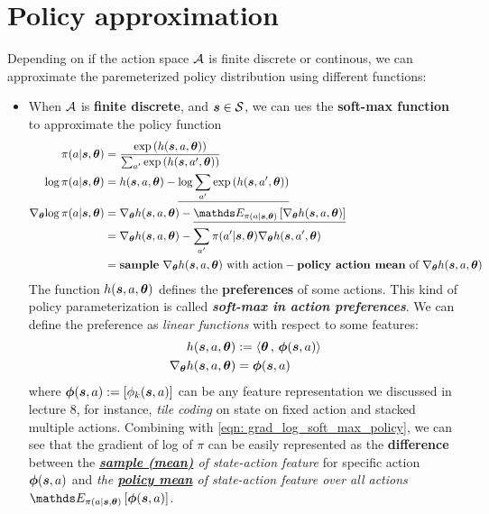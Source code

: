 \documentclass[11pt]{article}
\begin{document}
\section{Policy approximation}
Depending on if the action space  ${\mathcal A}$ is finite discrete or continous, we can approximate the paremeterized policy distribution using different functions:
\begin{itemize}
\item When ${\mathcal A}$ is \textbf{finite discrete}, and $\boldsymbol{s} \in {\mathcal S}$, we can ues the \textbf{soft-max function} to approximate the policy function
\begin{align}
\pi(a |\mb{s}, \mb{\theta}) &= \frac{\exp\paren{h(\mb{s}, a, \mb{\theta})}}{\sum_{a'}\exp\paren{h(\mb{s}, a', \mb{\theta})}} \label{eqn: soft_max_policy} \\
\log \pi(a |\mb{s}, \mb{\theta}) &= h(\mb{s}, a, \mb{\theta}) -  \underline{\log \sum_{a'}\exp\paren{h(\mb{s}, a', \mb{\theta})}}  \label{eqn: log_soft_max_policy} \\
\grad{\mb{\theta}}{\log \pi(a |\mb{s}, \mb{\theta}) } &= \grad{\mb{\theta}}{h(\mb{s}, a, \mb{\theta})} - \underline{\E{\pi(a |\mb{s}, \mb{\theta}) }{ \grad{\mb{\theta}}{h(\mb{s}, a, \mb{\theta})}}}   \label{eqn: grad_log_soft_max_policy} \\
&= \grad{\mb{\theta}}{h(\mb{s}, a, \mb{\theta})} - \sum_{a'}\pi(a' |\mb{s}, \mb{\theta}) \grad{\mb{\theta}}{h(\mb{s}, a', \mb{\theta})} \nonumber\\
&= \text{\textbf{sample} }\grad{\mb{\theta}}{h(\mb{s}, a, \mb{\theta})}\text{ with action} -  \text{\textbf{policy action mean} of }\grad{\mb{\theta}}{h(\mb{s}, a, \mb{\theta})} \nonumber
\end{align} The function $h(\boldsymbol{s}, a, \boldsymbol{\theta})$ defines the \textbf{preferences} of some actions. This kind of policy parameterization is called  \emph{\textbf{soft-max in action preferences}}. We can define the preference as \emph{linear functions} with respect to some features:
\begin{align*}
h(\boldsymbol{s}, a, \boldsymbol{\theta}) &:= \left\langle \boldsymbol{\theta}\,,\, \boldsymbol{\phi}(\boldsymbol{s}, a) \right\rangle \\
\nabla_{\boldsymbol{\theta}}{h(\boldsymbol{s}, a, \boldsymbol{\theta})} &= \boldsymbol{\phi}(\boldsymbol{s}, a)
\end{align*} where $\boldsymbol{\phi}(\boldsymbol{s}, a):= [\phi_{k}(\boldsymbol{s}, a)]$ can be any feature representation we discussed in lecture 8, for instance, \emph{tile coding} on state on fixed action and stacked multiple actions. Combining with \eqref{eqn: grad_log_soft_max_policy}, we can see that  the gradient of log of $\pi$ can be easily represented as the \textbf{difference} between the \emph{\textbf{\underline{sample (mean)}} of state-action feature} for specific action $\boldsymbol{\phi}(\boldsymbol{s}, a)$ and \emph{the \textbf{\underline{policy mean}} of state-action feature over all actions} $ \E{\pi(a |\mb{s}, \mb{\theta}) }{ \mb{\phi}(\mb{s}, a)}$.


\end{itemize}
\end{document}
